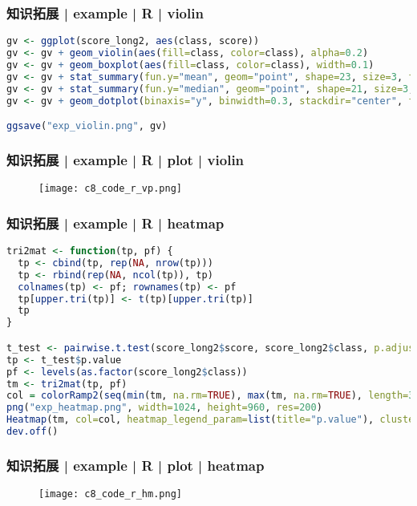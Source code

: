 \begin{frame}[fragile]
  \frametitle{知识拓展 | example | R | violin}
\begin{lstlisting}[language=r]
gv <- ggplot(score_long2, aes(class, score))
gv <- gv + geom_violin(aes(fill=class, color=class), alpha=0.2)
gv <- gv + geom_boxplot(aes(fill=class, color=class), width=0.1)
gv <- gv + stat_summary(fun.y="mean", geom="point", shape=23, size=3, fill="red")
gv <- gv + stat_summary(fun.y="median", geom="point", shape=21, size=3, fill="blue")
gv <- gv + geom_dotplot(binaxis="y", binwidth=0.3, stackdir="center", fill=NA)

ggsave("exp_violin.png", gv)
\end{lstlisting}
\end{frame}

\begin{frame}
  \frametitle{知识拓展 | example | R | plot | violin}
  \begin{figure}
    \centering
    \texttt{[image: c8\_code\_r\_vp.png]}
  \end{figure}
\end{frame}

\begin{frame}[fragile]
  \frametitle{知识拓展 | example | R | heatmap}
  \vspace{-0.8em}
\begin{lstlisting}[language=r,basicstyle=\footnotesize\tt,numberstyle=\scriptsize]
tri2mat <- function(tp, pf) {
  tp <- cbind(tp, rep(NA, nrow(tp)))
  tp <- rbind(rep(NA, ncol(tp)), tp)
  colnames(tp) <- pf; rownames(tp) <- pf
  tp[upper.tri(tp)] <- t(tp)[upper.tri(tp)]
  tp
}

t_test <- pairwise.t.test(score_long2$score, score_long2$class, p.adjust.method="none", pool.sd=FALSE)
tp <- t_test$p.value
pf <- levels(as.factor(score_long2$class))
tm <- tri2mat(tp, pf)
col = colorRamp2(seq(min(tm, na.rm=TRUE), max(tm, na.rm=TRUE), length=3), c("red", "#EEEEEE", "blue"), space="RGB")
png("exp_heatmap.png", width=1024, height=960, res=200)
Heatmap(tm, col=col, heatmap_legend_param=list(title="p.value"), cluster_rows=FALSE, cluster_columns=FALSE)
dev.off()
\end{lstlisting}
\end{frame}

\begin{frame}
  \frametitle{知识拓展 | example | R | plot | heatmap}
  \begin{figure}
    \centering
    \texttt{[image: c8\_code\_r\_hm.png]}
  \end{figure}
\end{frame}

